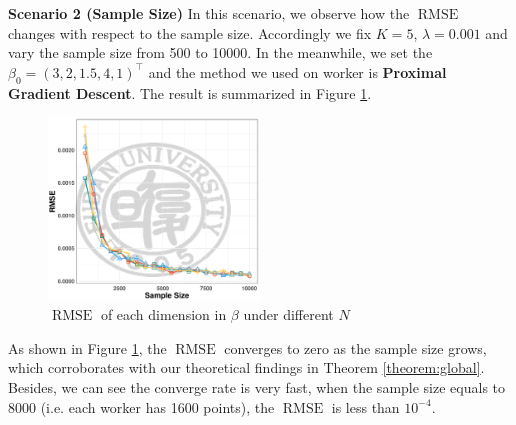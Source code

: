 \documentclass[11pt,en,authoryear]{elegantpaper}
\numberwithin{equation}{section}
\begin{document}
\noindent
{\sc \textbf{Scenario 2 (Sample Size)}}
In this scenario, we observe how the $\operatorname{RMSE}$ changes with respect to the sample size. Accordingly we fix $K=5$, $\lambda=0.001$ and vary the sample size from 500 to 10000. In the meanwhile, we set the $\beta_0 = (3, 2, 1.5, 4, 1)^{\top}$ and the method we used on worker is \textbf{Proximal Gradient Descent}. The result is summarized in  Figure \ref{fig:effet_of_N}.
\vspace{-0.5cm}
\begin{center}
    \begin{figure}[h]
        \centering
        \includegraphics[width=0.5\textwidth]{image/scenario2}
        \caption{$\operatorname{RMSE}$ of each dimension in $\beta$ under different $N$}
        \label{fig:effet_of_N}
    \end{figure}
\end{center}
As shown in Figure \ref{fig:effet_of_N}, the $\operatorname{RMSE}$ converges to zero as the sample size grows, which corroborates with our theoretical findings in Theorem \ref{theorem:global}. Besides, we can see the converge rate is very fast, when the sample size equals to 8000 (i.e. each worker has 1600 points), the $\operatorname{RMSE}$ is less than $10^{-4}$.
\end{document}
